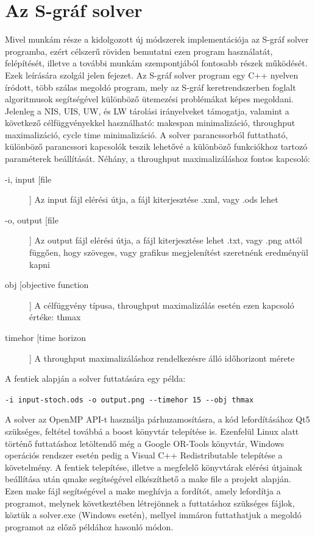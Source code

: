 \section{Az S-gráf solver} \label{s-graph_framework}
Mivel munkám része a kidolgozott új módszerek implementációja az S-gráf solver programba, ezért célszerű röviden bemutatni ezen program használatát, felépítését, illetve a további munkám szempontjából fontosabb részek működését.
Ezek leírására szolgál jelen fejezet.
Az S-gráf solver program egy C++ nyelven íródott, több szálas megoldó program, mely az S-gráf keretrendszerben foglalt algoritmusok segítségével különböző ütemezési problémákat képes megoldani.
Jelenleg a NIS, UIS, UW, és LW tárolási irányelveket támogatja, valamint a következő célfüggvényekkel használható: makespan minimalizáció, throughput maximalizáció, cycle time minimalizáció.
A solver parancssorból futtatható, különböző parancssori kapcsolók teszik lehetővé a különböző funkciókhoz tartozó paraméterek beállítását.
Néhány, a throughput maximalizáláshoz fontos kapcsoló:
\begin{description}
\item[-i, \text{-{}-}input [file]] Az input fájl elérési útja, a fájl kiterjesztése .xml, vagy .ods lehet
\item[-o, \text{-{}-}output [file]] Az output fájl elérési útja, a fájl kiterjesztése lehet .txt, vagy .png attól függően, hogy szöveges, vagy grafikus megjelenítést szeretnénk eredményül kapni
\item[\text{-{}-}obj [objective function]] A célfüggvény típusa, throughput maximalizálás esetén ezen kapcsoló értéke: thmax
\item[\text{-{}-}timehor [time horizon]] A throughput maximalizáláshoz rendelkezésre álló időhorizont mérete 
\end{description}
A fentiek alapján a solver futtatására egy példa:
\begin{center}
\verb|-i input-stoch.ods -o output.png --timehor 15 --obj thmax|
\end{center}
A solver az OpenMP API-t használja párhuzamosításra, a kód lefordításához Qt5 szükséges, feltétel továbbá a boost könyvtár telepítése is.
Ezenfelül Linux alatt történő futtatáshoz letöltendő még a Google OR-Tools könyvtár, Windows operációs rendszer esetén pedig a Visual C++ Redistributable telepítése a követelmény.
A fentiek telepítése, illetve a megfelelő könyvtárak elérési útjainak beállítása után qmake segítségével elkészíthető a make file a projekt alapján.
Ezen make fájl segítségével a make meghívja a fordítót, amely lefordítja a programot, melynek következtében létrejönnek a futtatáshoz szükséges fájlok, köztük a solver.exe (Windows esetén), mellyel immáron futtathatjuk a megoldó programot az előző példához hasonló módon.   

